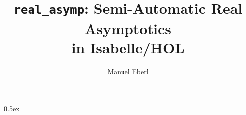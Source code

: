 \documentclass[11pt,a4paper]{article}
\begin{document}
\title{\texttt{real\_asymp}: Semi-Automatic Real Asymptotics\\ in Isabelle\slash HOL}
\author{Manuel Eberl}
\maketitle

\tableofcontents
\newpage
\parindent 0pt\parskip 0.5ex





\end{document}

